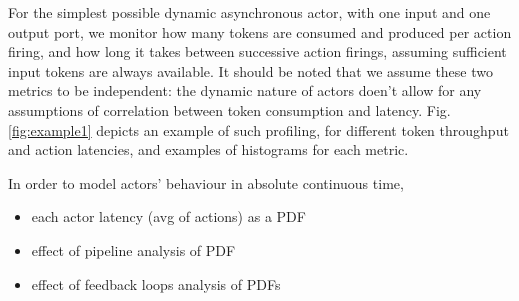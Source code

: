 For the simplest possible dynamic asynchronous actor, with one input and one output port, we monitor how many tokens are consumed and produced per action firing, and how long it takes between successive action firings, assuming sufficient input tokens are always available. It should be noted that we assume these two metrics to be independent: the dynamic nature of actors doen't allow for any assumptions of correlation between token consumption and latency. Fig. \ref{fig:example1} depicts an example of such profiling, for different token throughput and action latencies, and examples of histograms for each metric.



\par In order to model actors' behaviour in absolute continuous time, 

\begin{itemize}
\item each actor latency (avg of actions) as a PDF
\item effect of pipeline analysis of PDF
\item effect of feedback loops analysis of PDFs
\end{itemize}

